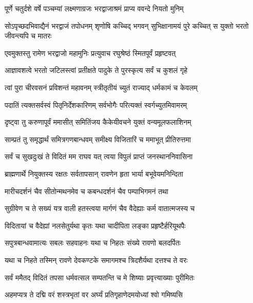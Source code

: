 
\twolineshloka
{पूर्णे चतुर्दशे वर्षे पञ्चम्यां लक्ष्मणाग्रजः}
{भरद्वाजाश्रमं प्राप्य ववन्दे नियतो मुनिम्} %

\threelineshloka
{सोऽपृच्छदभिवाद्यैनं भरद्वाजं तपोधनम्}
{शृणोषि कच्चिद् भगवन् सुभिक्षानामयं पुरे}
{कच्चित् स युक्तो भरतो जीवन्त्यपि च मातरः} %

\twolineshloka
{एवमुक्तस्तु रामेण भरद्वाजो महामुनिः}
{प्रत्युवाच रघुश्रेष्ठं स्मितपूर्वं प्रहृष्टवत्} %

\twolineshloka
{आज्ञावशत्वे भरतो जटिलस्त्वां प्रतीक्षते}
{पादुके ते पुरस्कृत्य सर्वं च कुशलं गृहे} %

\twolineshloka
{त्वां पुरा चीरवसनं प्रविशन्तं महावनम्}
{स्त्रीतृतीयं च्युतं राज्याद् धर्मकामं च केवलम्} %

\twolineshloka
{पदातिं त्यक्तसर्वस्वं पितृनिर्देशकारिणम्}
{सर्वभोगैः परित्यक्तं स्वर्गच्युतमिवामरम्} %

\twolineshloka
{दृष्ट्वा तु करुणापूर्वं ममासीत् समितिंजय}
{कैकेयीवचने युक्तं वन्यमूलफलाशिनम्} %

\twolineshloka
{साम्प्रतं तु समृद्धार्थं समित्रगणबान्धवम्}
{समीक्ष्य विजितारिं च ममाभूत् प्रीतिरुत्तमा} %

\twolineshloka
{सर्वं च सुखदुःखं ते विदितं मम राघव}
{यत् त्वया विपुलं प्राप्तं जनस्थाननिवासिना} %

\twolineshloka
{ब्राह्मणार्थे नियुक्तस्य रक्षतः सर्वतापसान्}
{रावणेन हृता भार्या बभूवेयमनिन्दिता} %

\twolineshloka
{मारीचदर्शनं चैव सीतोन्मथनमेव च}
{कबन्धदर्शनं चैव पम्पाभिगमनं तथा} %

\twolineshloka
{सुग्रीवेण च ते सख्यं यत्र वाली हतस्त्वया}
{मार्गणं चैव वैदेह्याः कर्म वातात्मजस्य च} %

\twolineshloka
{विदितायां च वैदेह्यां नलसेतुर्यथा कृतः}
{यथा चादीपिता लङ्का प्रहृष्टैर्हरियूथपैः} %

\twolineshloka
{सपुत्रबान्धवामात्यः सबलः सहवाहनः}
{यथा च निहतः संख्ये रावणो बलदर्पितः} %

\twolineshloka
{यथा च निहते तस्मिन् रावणे देवकण्टके}
{समागमश्च त्रिदशैर्यथा दत्तश्च ते वरः} %

\twolineshloka
{सर्वं ममैतद् विदितं तपसा धर्मवत्सल}
{सम्पतन्ति च मे शिष्याः प्रवृत्त्याख्याः पुरीमितः} %

\twolineshloka
{अहमप्यत्र ते दद्मि वरं शस्त्रभृतां वर}
{अर्घ्यं प्रतिगृहाणेदमयोध्यां श्वो गमिष्यसि} %

